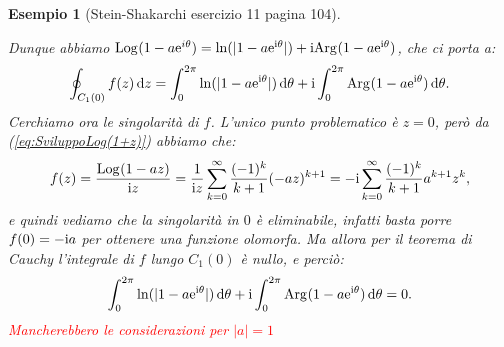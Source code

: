 \documentclass[11pt]{book}
\theoremstyle{Definizione}
\theoremstyle{TeoremaProposizioneLemmaCorollarioCongettura}
\theoremstyle{OsservazioneNotaEsempio}
\newtheorem{myes}{Esempio}[section]
\newcommand{\R}{\mathbb{R}}
\newcommand{\Arg}[1][]{\textup{Arg}_{#1}}
\renewcommand{\i}{\textup{i}}
\newcommand{\e}{\textup{e}}
\renewcommand{\d}{\mathrm{d}}
\newcommand{\dz}{\,\d z}
\newcommand{\dtheta}{\, \d \theta}
\newcommand{\Log}[1][]{\textup{Log}_{#1}}
\newcommand{\frecciaIn}{
\tikz \draw[-latex] (-1pt,0) -- (1pt,0);
}
\newcommand{\frecciaOut}{
\tikz \draw[latex-] (-1pt,0) -- (1pt,0);
}
\begin{document}
\begin{myes}[Stein-Shakarchi esercizio 11 pagina 104]
\begin{center}
\end{center}
Dunque abbiamo $\Log(1-a\e^{i\theta}) = \ln(|1-a\e^{\i\theta}|) + \i \Arg(1-a\e^{\i\theta})$, che ci porta a:
$$
\oint_{C_{1}(0)} f(z)\dz = \int_{0}^{2\pi} \ln(|1-a\e^{\i\theta}|)\dtheta + \i \int_{0}^{2\pi} \Arg(1-a\e^{\i\theta})\dtheta.
$$
Cerchiamo ora le singolarità di $f$. L'unico punto problematico è $z = 0$, però da (\ref{eq:SviluppoLog(1+z)}) abbiamo che:
$$
f(z) = \frac{\Log(1-az)}{\i z} = \frac{1}{\i z}\sum_{k = 0}^\infty \frac{(-1)^{k}}{k+1}(-a z)^{k+1} = -\i \sum_{k = 0}^\infty \frac{(-1)^k}{k+1}a^{k+1}z^k,
$$
e quindi vediamo che la singolarità in $0$ è eliminabile, infatti basta porre $f(0) = -\i a$ per ottenere una funzione olomorfa. Ma allora per il teorema di Cauchy l'integrale di $f$ lungo $C_1(0)$ è nullo, e perciò:
$$
\int_{0}^{2\pi} \ln(|1-a\e^{\i\theta}|)\dtheta + \i \int_{0}^{2\pi} \Arg(1-a\e^{\i\theta})\dtheta = 0.
$$
\textcolor{red}{Mancherebbero le considerazioni per $|a| = 1$}
\end{myes}
\end{document}
